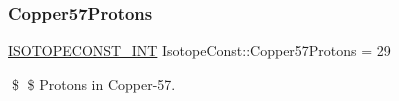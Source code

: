 \subsubsection{\texorpdfstring{Copper57\+Protons}{Copper57Protons}}
{\footnotesize\ttfamily \mbox{\hyperlink{group___isotope_const-_macros_ga5f18360b3e99483a35c32d789e62621c}{I\+S\+O\+T\+O\+P\+E\+C\+O\+N\+S\+T\+\_\+\+I\+NT}} Isotope\+Const\+::\+Copper57\+Protons = 29}

\$ \$ Protons in Copper-\/57. 